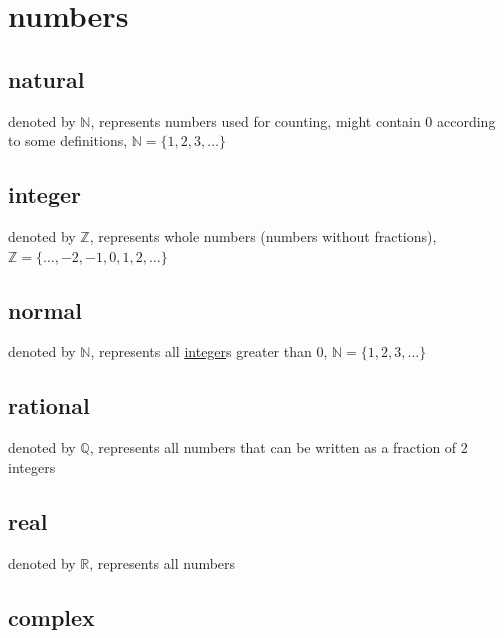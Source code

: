\documentclass[a4paper,12pt]{article}
\newcommand{\?}{\stackrel{?}{=}}
\begin{document}
\section{numbers}
\label{sec:org6fbc91e}
\subsection{natural}
\label{sec:orgd839596}
\begin{definition}
denoted by \(\mathbb{N}\), represents numbers used for counting, might contain 0 according to some definitions, \(\mathbb{N} = \{1,2,3,\dots\}\)\\[0pt]
\end{definition}
\subsection{integer}
\label{sec:orgfd7aca8}
\begin{definition}
denoted by \(\mathbb{Z}\), represents whole numbers (numbers without fractions), \(\mathbb{Z} = \{\ldots,-2,-1,0,1,2,\ldots\}\)\\[0pt]
\end{definition}
\subsection{normal}
\label{sec:org89e30d2}
\begin{definition}
denoted by \(\mathbb{N}\), represents all \hyperref[sec:orgfd7aca8]{integer}s greater than 0, \(\mathbb{N} = \{1,2,3,\ldots\}\)\\[0pt]
\end{definition}
\subsection{rational}
\label{sec:org3d83069}
\begin{definition}
denoted by \(\mathbb{Q}\), represents all numbers that can be written as a fraction of 2 integers\\[0pt]
\end{definition}
\subsection{real}
\label{sec:org6805ed1}
\begin{definition}
denoted by \(\mathbb{R}\), represents all numbers\\[0pt]
\end{definition}
\subsection{complex}
\label{sec:org8392c77}
\end{document}
